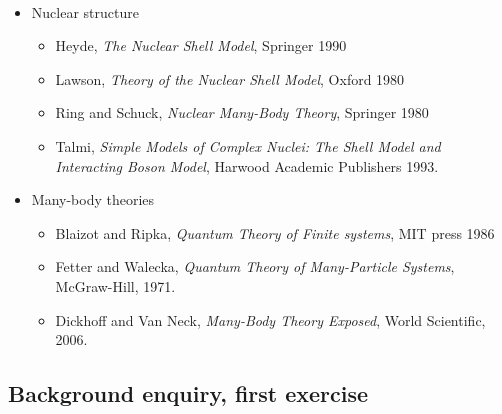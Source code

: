 \documentclass[%
oneside,                 %
final,                   %
10pt]{article}
\begin{document}
\paragraph{}
\begin{itemize}
\item Nuclear structure
\begin{itemize}

 \item Heyde, \emph{The Nuclear Shell Model}, Springer 1990

 \item Lawson, \emph{Theory of the Nuclear Shell Model}, Oxford 1980

 \item Ring and Schuck, \emph{Nuclear Many-Body Theory}, Springer 1980

 \item Talmi, \emph{Simple Models of Complex Nuclei: The Shell Model and Interacting Boson Model}, Harwood Academic Publishers 1993.

\end{itemize}

\noindent
\item Many-body theories
\begin{itemize}

 \item Blaizot and Ripka, \emph{Quantum Theory of Finite systems}, MIT press 1986

 \item Fetter and Walecka, \emph{Quantum Theory of Many-Particle Systems}, McGraw-Hill, 1971.

 \item Dickhoff and Van Neck, \emph{Many-Body Theory Exposed}, World Scientific, 2006.
\end{itemize}

\noindent
\end{itemize}

\noindent








\subsection*{Background enquiry, first exercise}

\end{document}
